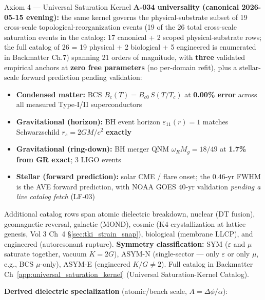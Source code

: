 \begin{resultbox}{Axiom 4 — Universal Saturation Kernel}
\medskip\noindent
\textbf{A-034 universality (canonical 2026-05-15 evening):} the same kernel governs the physical-substrate subset of 19 cross-scale topological-reorganization events (19 of the 26 total cross-scale saturation events in the catalog: 17 canonical + 2 scoped physical-substrate rows; the full catalog of 26 = 19 physical + 2 biological + 5 engineered is enumerated in Backmatter Ch.7) spanning 21 orders of magnitude, with \textbf{three} validated empirical anchors at \textbf{zero free parameters} (no per-domain refit), plus a stellar-scale forward prediction pending validation:
\begin{itemize}\itemsep 0pt
    \item \textbf{Condensed matter:} BCS $B_c(T) = B_{c0}\, S(T/T_c)$ at \textbf{0.00\% error} across all measured Type-I/II superconductors
    \item \textbf{Gravitational (horizon):} BH event horizon $\varepsilon_{11}(r) = 1$ matches Schwarzschild $r_s = 2GM/c^2$ \textbf{exactly}
    \item \textbf{Gravitational (ring-down):} BH merger QNM $\omega_R M_g = 18/49$ at \textbf{1.7\% from GR exact}; 3 LIGO events
    \item \textbf{Stellar (forward prediction):} solar CME / flare onset; the $0.46$-yr FWHM is the AVE forward prediction, with NOAA GOES 40-yr validation \emph{pending a live catalog fetch} (LF-03)
\end{itemize}
Additional catalog rows span atomic dielectric breakdown, nuclear (DT fusion), geomagnetic reversal, galactic (MOND), cosmic (K4 crystallization at lattice genesis, Vol 3 Ch~4 \S\ref{sec:tki_strain_snap}), biological (membrane LLCP), and engineered (autoresonant rupture). \textbf{Symmetry classification:} SYM ($\varepsilon$ and $\mu$ saturate together, vacuum $K = 2G$), ASYM-N (single-sector --- only $\varepsilon$ or only $\mu$, e.g., BCS $\mu$-only), ASYM-E (engineered $K/G \neq 2$). Full catalog in Backmatter Ch~\ref{app:universal_saturation_kernel} (Universal Saturation-Kernel Catalog).

\medskip\noindent
\textbf{Derived dielectric specialization} (atomic/bench scale, $A = \Delta\phi/\alpha$):


\end{resultbox}
